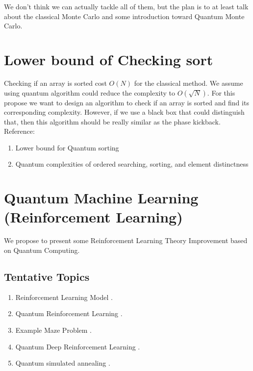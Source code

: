 \documentclass{article}%
\begin{document}
We don't think we can actually tackle all of them, but the plan is to at least talk about 
the classical Monte Carlo and some introduction toward Quantum Monte Carlo.

\section*{Lower bound of Checking sort}

Checking if an array is sorted cost $O(N)$ for the classical method. 
We assume using quantum algorithm could reduce the complexity to $O(\sqrt{N})$. 
For this propose we want to design an algorithm to check if an array is sorted and find its corresponding complexity.
However, if we use a black box that could distinguish that, then this algorithm should be really similar as the phase kickback.
\\

Reference:
\begin{enumerate}
    \item Lower bound for Quantum sorting \cite{shi2000quantum}
    \item Quantum complexities of ordered searching, sorting, and element distinctness \cite{hoyer2002quantum}
\end{enumerate}


\section*{Quantum Machine Learning (Reinforcement Learning)}

We propose to present some Reinforcement Learning Theory Improvement 
based on Quantum Computing.

\subsection*{Tentative Topics}

\begin{enumerate}
    \item Reinforcement Learning Model \cite{agarwal2019reinforcement, dong2008quantum}.
    \item Quantum Reinforcement Learning \cite{dong2008quantum, meyer2022survey}.
    \item Example Maze Problem \cite{mackeprang2020reinforcement}.
    \item Quantum Deep Reinforcement Learning \cite{jerbi2021quantum}.
    \item Quantum simulated annealing \cite{jerbi2021quantum}.
\end{enumerate}
\end{document}
